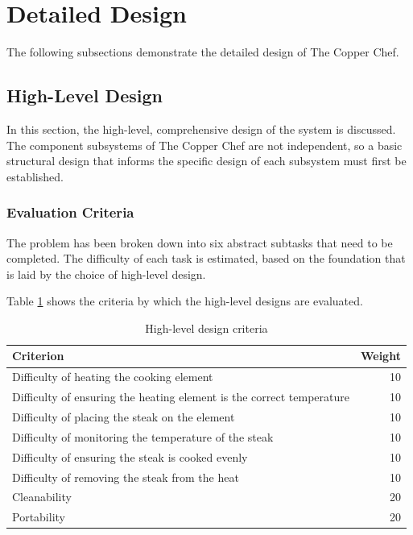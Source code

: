 \documentclass[11pt]{article}
\begin{document}
\newpage
\section{Detailed Design}

The following subsections demonstrate the detailed design of The Copper Chef.

\subsection{High-Level Design}

In this section, the high-level, comprehensive design of the system is discussed.
The component subsystems of The Copper Chef are not independent, so a basic structural design that informs the specific design of each subsystem must first be established.

\subsubsection{Evaluation Criteria}

The problem has been broken down into six abstract subtasks that need to be completed.
The difficulty of each task is estimated, based on the foundation that is laid by the choice of high-level design.

Table \ref{table:high_level_criteria} shows the criteria by which the high-level designs are evaluated.

\begin{table}[H]
\begin{tabularx}{\textwidth}{X  r}

  \hline

  Criterion & Weight \\

  \hline

  Difficulty of heating the cooking element & 10 \\
  Difficulty of ensuring the heating element is the correct temperature & 10 \\
  Difficulty of placing the steak on the element & 10 \\
  Difficulty of monitoring the temperature of the steak & 10 \\
  Difficulty of ensuring the steak is cooked evenly & 10 \\
  Difficulty of removing the steak from the heat & 10 \\
  Cleanability & 20 \\
  Portability & 20 \\

  \hline

\end{tabularx}
\caption{High-level design criteria}
\label{table:high_level_criteria}
\end{table}
\end{document}

